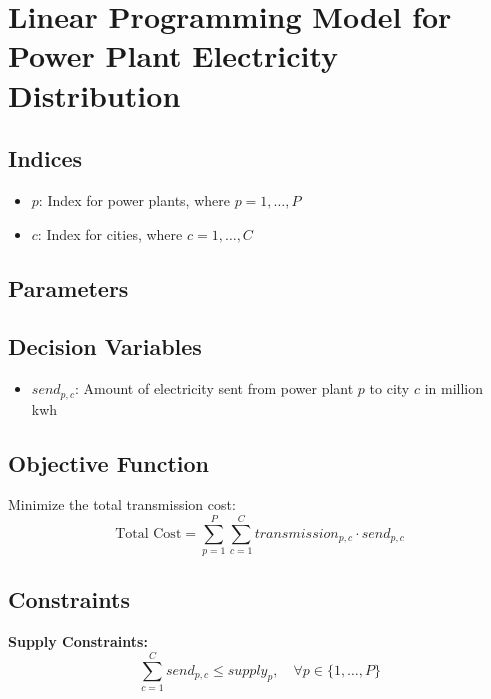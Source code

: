 \documentclass{article}
\begin{document}
\section*{Linear Programming Model for Power Plant Electricity Distribution}

\subsection*{Indices}
\begin{itemize}
    \item $p$: Index for power plants, where $p = 1, \ldots, P$
    \item $c$: Index for cities, where $c = 1, \ldots, C$
\end{itemize}

\subsection*{Parameters}

\subsection*{Decision Variables}
\begin{itemize}
    \item $send_{p,c}$: Amount of electricity sent from power plant $p$ to city $c$ in million kwh
\end{itemize}

\subsection*{Objective Function}
Minimize the total transmission cost:
\[
\text{Total Cost} = \sum_{p=1}^{P} \sum_{c=1}^{C} transmission_{p,c} \cdot send_{p,c}
\]

\subsection*{Constraints}

\textbf{Supply Constraints:}
\[
\sum_{c=1}^{C} send_{p,c} \leq supply_{p}, \quad \forall p \in \{1, \ldots, P\}
\]
\end{document}
